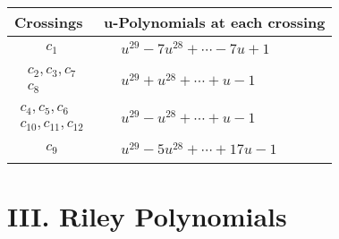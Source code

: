 \documentclass[1p]{elsarticle_modified}
\theoremstyle{definition}
\begin{document}
\begin{tabular}{m{50pt}|m{274pt}}
Crossings & \hspace{64pt}u-Polynomials at each crossing \\
\hline $$\begin{aligned}c_{1}\end{aligned}$$&$\begin{aligned}
&u^{29}-7 u^{28}+\cdots-7 u+1
\end{aligned}$\\
\hline $$\begin{aligned}c_{2},c_{3},c_{7}\\c_{8}\end{aligned}$$&$\begin{aligned}
&u^{29}+u^{28}+\cdots+u-1
\end{aligned}$\\
\hline $$\begin{aligned}c_{4},c_{5},c_{6}\\c_{10},c_{11},c_{12}\end{aligned}$$&$\begin{aligned}
&u^{29}- u^{28}+\cdots+u-1
\end{aligned}$\\
\hline $$\begin{aligned}c_{9}\end{aligned}$$&$\begin{aligned}
&u^{29}-5 u^{28}+\cdots+17 u-1
\end{aligned}$\\
\hline
\end{tabular}\newpage\renewcommand{\arraystretch}{1}
\centering \section*{ III. Riley Polynomials}
\end{document}
